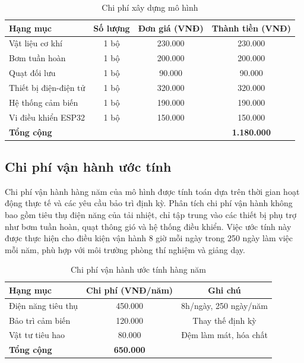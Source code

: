 \documentclass[../main.tex]{subfiles}
\begin{document}
\begin{table}[H]
\centering
\renewcommand{\arraystretch}{1.2}
\caption{Chi phí xây dựng mô hình}
\label{tab:construction_cost}
\begin{tabular}{|l|c|c|c|}
\hline
\textbf{Hạng mục} & \textbf{Số lượng} & \textbf{Đơn giá (VNĐ)} & \textbf{Thành tiền (VNĐ)} \\
\hline
Vật liệu cơ khí & 1 bộ & 230.000 & 230.000 \\
\hline
Bơm tuần hoàn & 1 bộ & 200.000 & 200.000 \\
\hline
Quạt đối lưu & 1 bộ & 90.000 & 90.000 \\
\hline
Thiết bị điện-điện tử & 1 bộ & 320.000 & 320.000 \\
\hline
Hệ thống cảm biến & 1 bộ & 190.000 & 190.000 \\
\hline
Vi điều khiển ESP32 & 1 bộ & 150.000 & 150.000 \\
\hline
\textbf{Tổng cộng} & & & \textbf{1.180.000} \\
\hline
\end{tabular}
\end{table}

\subsection{Chi phí vận hành ước tính}
\label{sec:operating_cost}

Chi phí vận hành hàng năm của mô hình được tính toán dựa trên thời gian hoạt động thực tế và các yêu cầu bảo trì định kỳ. Phân tích chi phí vận hành không bao gồm tiêu thụ điện năng của tải nhiệt, chỉ tập trung vào các thiết bị phụ trợ như bơm tuần hoàn, quạt thông gió và hệ thống điều khiển. Việc ước tính này được thực hiện cho điều kiện vận hành 8 giờ mỗi ngày trong 250 ngày làm việc mỗi năm, phù hợp với môi trường phòng thí nghiệm và giảng dạy.

\begin{table}[H]
\centering
\renewcommand{\arraystretch}{1.2}
\caption{Chi phí vận hành ước tính hàng năm}
\label{tab:operating_cost}
\begin{tabular}{|l|c|c|}
\hline
\textbf{Hạng mục} & \textbf{Chi phí (VNĐ/năm)} & \textbf{Ghi chú} \\
\hline
Điện năng tiêu thụ & 450.000 & 8h/ngày, 250 ngày/năm \\
\hline
Bảo trì cảm biến & 120.000 & Thay thế định kỳ \\
\hline
Vật tư tiêu hao & 80.000 & Đệm làm mát, hóa chất \\
\hline
\textbf{Tổng cộng} & \textbf{650.000} & \\
\hline
\end{tabular}
\end{table}
\end{document}
